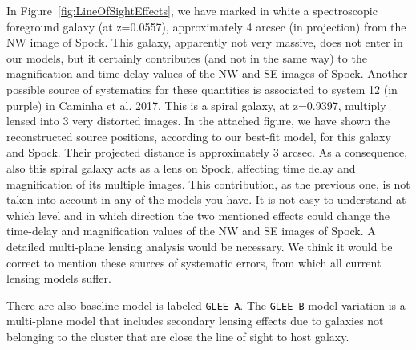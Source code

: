 In Figure~\ref{fig:LineOfSightEffects}, we have marked in white a
spectroscopic foreground galaxy (at z=0.0557), approximately 4 arcsec
(in projection) from the NW image of Spock. This galaxy, apparently
not very massive, does not enter in our models, but it certainly
contributes (and not in the same way) to the magnification and
time-delay values of the NW and SE images of Spock. Another possible
source of systematics for these quantities is associated to system 12
(in purple) in Caminha et al. 2017. This is a spiral galaxy, at
z=0.9397, multiply lensed into 3 very distorted images. In the
attached figure, we have shown the reconstructed source positions,
according to our best-fit model, for this galaxy and Spock. Their
projected distance is approximately 3 arcsec. As a consequence, also
this spiral galaxy acts as a lens on Spock, affecting time delay and
magnification of its multiple images. This contribution, as the
previous one, is not taken into account in any of the models you
have. It is not easy to understand at which level and in which
direction the two mentioned effects could change the time-delay and
magnification values of the NW and SE images of Spock. A detailed
multi-plane lensing analysis would be necessary. We think it would be
correct to mention these sources of systematic errors, from which all
current lensing models suffer.

There are also baseline model is labeled {\tt GLEE-A}.  The {\tt GLEE-B} model variation is
  a multi-plane model that includes secondary lensing effects due to
  galaxies not belonging to the cluster that are close the line of
  sight to \spock host galaxy.

